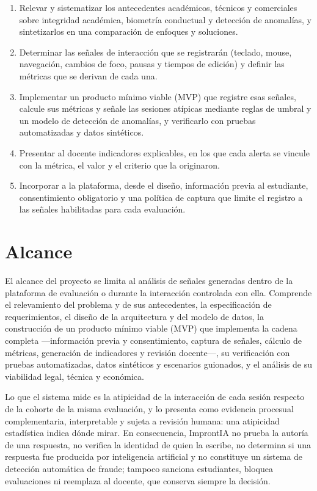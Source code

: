 \begin{enumerate}
\item Relevar y sistematizar los antecedentes académicos, técnicos y comerciales sobre integridad académica, biometría conductual y detección de anomalías, y sintetizarlos en una comparación de enfoques y soluciones.
\item Determinar las señales de interacción que se registrarán (teclado, mouse, navegación, cambios de foco, pausas y tiempos de edición) y definir las métricas que se derivan de cada una.
\item Implementar un producto mínimo viable (MVP) que registre esas señales, calcule sus métricas y señale las sesiones atípicas mediante reglas de umbral y un modelo de detección de anomalías, y verificarlo con pruebas automatizadas y datos sintéticos.
\item Presentar al docente indicadores explicables, en los que cada alerta se vincule con la métrica, el valor y el criterio que la originaron.
\item Incorporar a la plataforma, desde el diseño, información previa al estudiante, consentimiento obligatorio y una política de captura que limite el registro a las señales habilitadas para cada evaluación.
\end{enumerate}

\section{Alcance}
\label{sec:alcance}

El alcance del proyecto se limita al análisis de señales generadas dentro de la plataforma de evaluación o durante la interacción controlada con ella. Comprende el relevamiento del problema y de sus antecedentes, la especificación de requerimientos, el diseño de la arquitectura y del modelo de datos, la construcción de un producto mínimo viable (MVP) que implementa la cadena completa ---información previa y consentimiento, captura de señales, cálculo de métricas, generación de indicadores y revisión docente---, su verificación con pruebas automatizadas, datos sintéticos y escenarios guionados, y el análisis de su viabilidad legal, técnica y económica.

Lo que el sistema mide es la atipicidad de la interacción de cada sesión respecto de la cohorte de la misma evaluación, y lo presenta como evidencia procesual complementaria, interpretable y sujeta a revisión humana: una atipicidad estadística indica dónde mirar. En consecuencia, ImprontIA no prueba la autoría de una respuesta, no verifica la identidad de quien la escribe, no determina si una respuesta fue producida por inteligencia artificial y no constituye un sistema de detección automática de fraude; tampoco sanciona estudiantes, bloquea evaluaciones ni reemplaza al docente, que conserva siempre la decisión.

